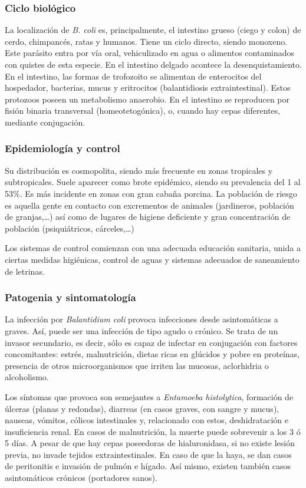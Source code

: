 \subsubsection{Ciclo biológico}
La localización de \textit{B. coli} es, principalmente, el intestino grueso (ciego y colon) de cerdo, chimpancés, ratas y humanos. Tiene un ciclo directo, siendo monoxeno. Este parásito entra por vía oral, vehiculizado en agua o alimentos contaminados con quistes de esta especie. En el intestino delgado acontece la desenquistamiento. En el intestino, las formas de trofozoito se alimentan de enterocitos del hospedador, bacterias, mucus y eritrocitos (balantidiosis extraintestinal). Estos protozoos poseen un metabolismo anaerobio. En el intestino se reproducen por fisión binaria transversal (homeotetogónica), o, cuando hay cepas diferentes, mediante conjugación.
\subsubsection{Epidemiología y control}
Su distribución es cosmopolita, siendo más frecuente en zonas tropicales y subtropicales. Suele aparecer como brote epidémico, siendo su prevalencia del 1 al 53\%. Es más incidente en zonas con gran cabaña porcina. La población de riesgo es aquella gente en contacto con excrementos de animales (jardineros, población de granjas,…) así como de lugares de higiene deficiente y gran concentración de población (psiquiátricos, cárceles,…)

Los sistemas de control comienzan con una adecuada educación sanitaria, unida a ciertas medidas higiénicas, control de aguas y sistemas adecuados de saneamiento de letrinas.
\subsubsection{Patogenia y sintomatología}
La infección por \textit{Balantidium coli} provoca infecciones desde asintomáticas a graves. Así, puede ser una infección de tipo agudo o crónico. Se trata de un invasor secundario, es decir, sólo es capaz de infectar en conjugación con factores concomitantes: estrés, malnutrición, dietas ricas en glúcidos y pobre en proteínas, presencia de otros microorganismos que irriten las mucosas, aclorhidria o alcoholismo.

Los síntomas que provoca son semejantes a \textit{Entamoeba histolytica}, formación de úlceras (planas y redondas), diarreas (en casos graves, con sangre y mucus), nauseas, vómitos, cólicos intestinales y, relacionado con estos, deshidratación e insuficiencia renal. En casos de malnutrición, la muerte puede sobrevenir a los 3 ó 5 días. A pesar de que hay cepas poseedoras de hialuronidasa, si no existe lesión previa, no invade tejidos extraintestinales. En caso de que la haya, se dan casos de peritonitis e invasión de pulmón e hígado. Así mismo, existen también casos asintomáticos crónicos (portadores sanos).
